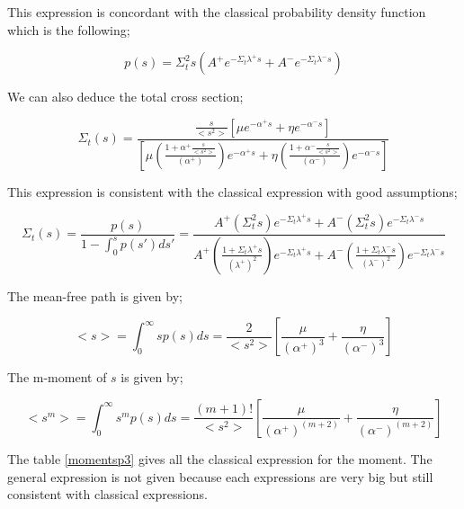 \documentclass[a4paper, 12pt]{report}
\newcommand{\bl}{\big<}
\newcommand{\bg}{\big>}
\begin{document}
This expression is concordant with the classical probability density function which is the following;

\begin{equation}
p(s) = \Sigma_t^2s \left(A^+ e^{-\Sigma_t \lambda^+ s} + A^- e^{-\Sigma_t \lambda^- s}  \right)
\end{equation}


We can also deduce the total cross section;

\begin{equation}
\Sigma_t(s) = \frac{\frac{s}{{{\bl s^2 \bg}}} \left[\mu e^{-\alpha^+ s} + \eta e^{-\alpha^- s}\right]}{\left[\mu \left( \frac{1+ \alpha^+\frac{s}{{{\bl s^2 \bg}}}}{\left(\alpha^+\right)}\right)e^{-\alpha^+ s} + \eta \left( \frac{1+ \alpha^-\frac{s}{{{\bl s^2 \bg}}}}{\left(\alpha^-\right)}\right)e^{-\alpha^- s}\right]}
\end{equation}

This expression is consistent with the classical expression with good assumptions;

\begin{equation}
\Sigma_t(s) = \frac{p(s)}{1-\int_0^sp(s')ds'} = \frac{A^+(\Sigma_t^2s)e^{-\Sigma_t \lambda^+ s} + A^-(\Sigma_t^2s)e^{-\Sigma_t \lambda^- s} }{A^+(\frac{1+\Sigma_t\lambda^+s}{(\lambda^+)^2})e^{-\Sigma_t \lambda^+ s} + A^-(\frac{1+\Sigma_t\lambda^-s}{(\lambda^-)^2})e^{-\Sigma_t \lambda^- s}}
\end{equation}

The mean-free path is given by;

\begin{equation}
{\bl s\bg} = \int_0^\infty sp(s) ds = \frac{2}{{\bl s^2 \bg}}\left[\frac{\mu}{\left(\alpha^+\right)^3} + \frac{\eta}{\left(\alpha^-\right)^3}\right]
\end{equation}

The m-moment of $s$ is given by;

\begin{equation}
{\bl s^m \bg} = \int_0^\infty s^m p(s) ds = \frac{(m+1)!}{{\bl s^2 \bg}}\left[\frac{\mu}{\left(\alpha^+\right)^{(m+2)}} + \frac{\eta}{\left(\alpha^-\right)^{(m+2)}}\right]
\end{equation}

The table \ref{momentsp3} gives all the classical expression for the moment. The general expression is not given because each expressions are very big but still consistent with classical expressions.
\end{document}
